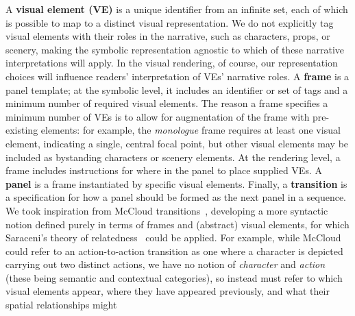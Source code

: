 A {\bf visual element (VE)} is a unique identifier from an infinite set,
each of which is possible to map to a distinct visual representation.
We do not explicitly tag visual elements with their roles in the narrative,
such as characters, props, or scenery, making the symbolic representation
agnostic to which of these narrative interpretations will apply. In the
visual rendering, of course, our representation choices will influence
readers' interpretation of VEs' narrative roles.
%
A {\bf frame} is a panel template; at the symbolic level, it
includes an identifier or set of tags and a minimum number of required
visual elements. The reason a frame specifies a {minimum} number of VEs
is to allow for augmentation of the frame with pre-existing elements: for
example, the {\em monologue} frame requires at least one visual element,
indicating a single, central focal point, but other visual elements may be
included as bystanding characters or scenery elements.
At the rendering level, a frame includes instructions for where in the
panel to place supplied VEs.
A {\bf panel} is a frame instantiated by specific visual elements.
%
%
Finally, a {\bf transition} is a specification for how a panel should be
formed as the next panel in a sequence.
%
We took inspiration from McCloud
transitions~\cite{mcCloud1993understanding}, developing a more
syntactic notion  defined purely in terms of frames and (abstract) visual
elements, for which Saraceni's theory of
relatedness~\cite{saraceni2016relatedness} could be applied. For example,
while McCloud could refer to an action-to-action transition as one where a
character is depicted carrying out two distinct actions, we have no notion
of {\em character} and {\em action} (these being semantic and contextual
categories), so instead must refer to which visual elements appear, where
they have appeared previously, and what their spatial relationships might
